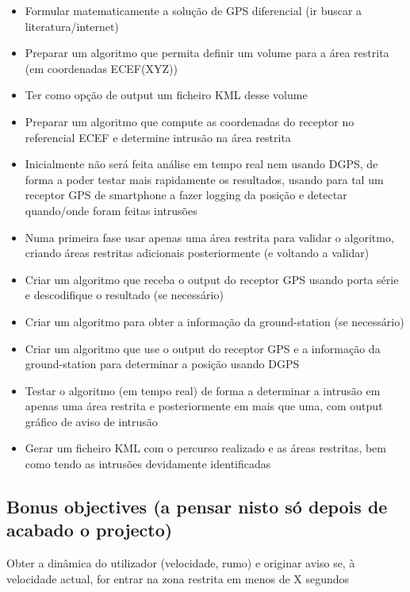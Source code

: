 \documentclass{article}
\begin{document}
\begin{itemize}
	\item Formular matematicamente a solução de GPS diferencial (ir buscar a literatura/internet)
	\item Preparar um algoritmo que permita definir um volume para a área restrita (em coordenadas ECEF(XYZ)) 
	\item Ter como opção de output um ficheiro KML desse volume
	\item Preparar um algoritmo que compute as coordenadas do receptor no referencial ECEF e determine intrusão na área restrita
	\item Inicialmente não será feita análise em tempo real nem usando DGPS, de forma a poder testar mais rapidamente os resultados, usando para tal um receptor GPS de smartphone a fazer logging da posição e detectar quando/onde foram feitas intrusões
	\item Numa primeira fase usar apenas uma área restrita para validar o algoritmo, criando áreas restritas adicionais posteriormente (e voltando a validar)
	\item Criar um algoritmo que receba o output do receptor GPS usando porta série e descodifique o resultado (se necessário)
	\item Criar um algoritmo para obter a informação da ground-station (se necessário)
	\item Criar um algoritmo que use o output do receptor GPS e a informação da ground-station para determinar a posição usando DGPS
	\item Testar o algoritmo (em tempo real) de forma a determinar a intrusão em apenas uma área restrita e posteriormente em mais que uma, com output gráfico de aviso de intrusão
	\item Gerar um ficheiro KML com o percurso realizado e as áreas restritas, bem como tendo as intrusões devidamente identificadas
\end{itemize}

\subsection{Bonus objectives (a pensar nisto só depois de acabado o projecto)}
Obter a dinâmica do utilizador (velocidade, rumo) e originar aviso se, à velocidade actual, for entrar na zona restrita em menos de X segundos
\end{document}
